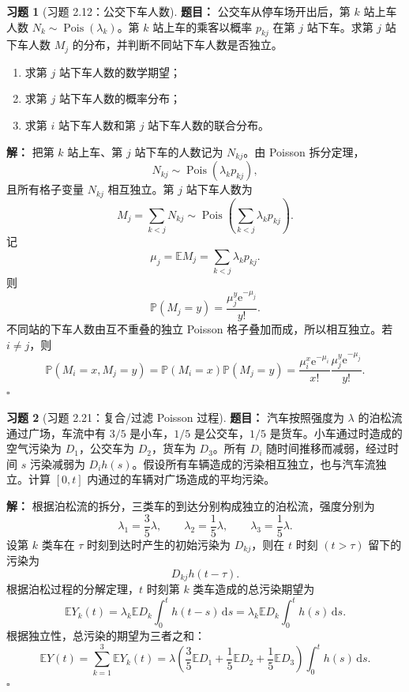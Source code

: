 \documentclass[12pt,a4paper,openany]{ctexrep}
\theoremstyle{definition}
\newtheorem{exercise}{习题}[section]
\newenvironment{solution}{\par\noindent\textbf{解：}}{\hfill$\square$\par}
\newcommand{\E}{\mathbb{E}}
\newcommand{\Pp}{\mathbb{P}}
\newcommand{\Pois}{\operatorname{Pois}}
\newcommand{\dd}{\,\mathrm{d}}
\newcommand{\e}{\mathrm{e}}
\begin{document}
\begin{exercise}[习题 2.12：公交下车人数]
\textbf{题目：}
公交车从停车场开出后，第 $k$ 站上车人数 $N_k\sim\Pois(\lambda_k)$。第 $k$ 站上车的乘客以概率 $p_{kj}$ 在第 $j$ 站下车。求第 $j$ 站下车人数 $M_j$ 的分布，并判断不同站下车人数是否独立。
\begin{enumerate}[label=(\alph*)]
	\item 求第 $j$ 站下车人数的数学期望；
	\item 求第 $j$ 站下车人数的概率分布；
	\item 求第 $i$ 站下车人数和第 $j$ 站下车人数的联合分布。
\end{enumerate}
\end{exercise}
\begin{solution}
把第 $k$ 站上车、第 $j$ 站下车的人数记为 $N_{kj}$。由 Poisson 拆分定理，
\[
N_{kj}\sim\Pois(\lambda_kp_{kj}),
\]
且所有格子变量 $N_{kj}$ 相互独立。第 $j$ 站下车人数为
\[
M_j=\sum_{k<j}N_{kj}\sim \Pois\left(\sum_{k<j}\lambda_kp_{kj}\right).
\]
记
\[
\mu_j=\E M_j=\sum_{k<j}\lambda_kp_{kj}.
\]
则
\[
\Pp(M_j=y)=\frac{\mu_j^y\e^{-\mu_j}}{y!}.
\]
不同站的下车人数由互不重叠的独立 Poisson 格子叠加而成，所以相互独立。若 $i\ne j$，则
\[
\Pp(M_i=x,M_j=y)=\Pp(M_i=x)\Pp(M_j=y)
=\frac{\mu_i^x\e^{-\mu_i}}{x!}\frac{\mu_j^y\e^{-\mu_j}}{y!}.
\]
\end{solution}

\begin{exercise}[习题 2.21：复合/过滤 Poisson 过程]
\textbf{题目：}
汽车按照强度为 $\lambda$ 的泊松流通过广场，车流中有 $3/5$ 是小车，$1/5$ 是公交车，$1/5$ 是货车。小车通过时造成的空气污染为 $D_1$，公交车为 $D_2$，货车为 $D_3$。所有 $D_i$ 随时间推移而减弱，经过时间 $s$ 污染减弱为 $D_i h(s)$。假设所有车辆造成的污染相互独立，也与汽车流独立。计算 $[0,t]$ 内通过的车辆对广场造成的平均污染。
\end{exercise}
\begin{solution}
根据泊松流的拆分，三类车的到达分别构成独立的泊松流，强度分别为
\[
\lambda_1=\frac35\lambda,\qquad
\lambda_2=\frac15\lambda,\qquad
\lambda_3=\frac15\lambda.
\]
设第 $k$ 类车在 $\tau$ 时刻到达时产生的初始污染为 $D_{kj}$，则在 $t$ 时刻 $(t>\tau)$ 留下的污染为
\[
D_{kj}h(t-\tau).
\]
根据泊松过程的分解定理，$t$ 时刻第 $k$ 类车造成的总污染期望为
\[
\E Y_k(t)
=
\lambda_k \E D_k \int_0^t h(t-s)\dd s
=
\lambda_k \E D_k \int_0^t h(s)\dd s.
\]
根据独立性，总污染的期望为三者之和：
\[
\E Y(t)
=
\sum_{k=1}^3\E Y_k(t)
=
\lambda\left(\frac35\E D_1+\frac15\E D_2+\frac15\E D_3\right)
\int_0^t h(s)\dd s.
\]
\end{solution}
\end{document}
